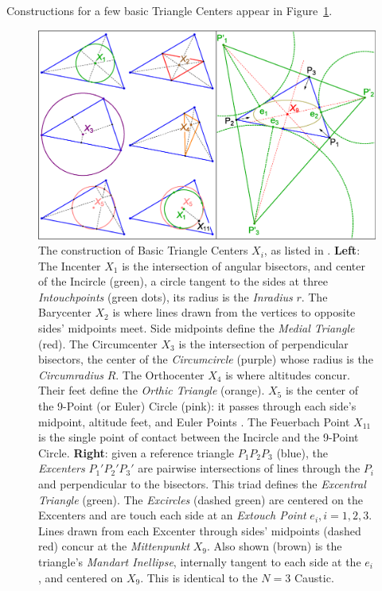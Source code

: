 Constructions for a few basic Triangle Centers appear in Figure~\ref{fig:constructions}.

\begin{figure}
    \centering
    \includegraphics[width=\textwidth]{1010_pics_constr.eps}
    \caption{The construction of Basic Triangle Centers $X_i$, as listed in \cite{etc}. \textbf{Left}: The Incenter $X_1$ is the intersection of angular bisectors, and center of the Incircle (green), a circle tangent to the sides at three {\em Intouchpoints} (green dots), its radius is the {\em Inradius} $r$. The Barycenter $X_2$ is where lines drawn from the vertices to opposite sides' midpoints meet. Side midpoints define the {\em Medial Triangle} (red). The Circumcenter $X_3$ is the intersection of perpendicular bisectors, the center of the {\em Circumcircle} (purple) whose radius is the {\em Circumradius} $R$. The Orthocenter $X_4$ is where altitudes concur. Their feet define the {\em Orthic Triangle} (orange). $X_5$ is the center of the 9-Point (or Euler) Circle (pink): it passes through each side's midpoint, altitude feet, and Euler Points \cite{mw}. The Feuerbach Point $X_{11}$ is the single point of contact between the Incircle and the 9-Point Circle. \textbf{Right}: given a reference triangle $P_1P_2P_3$ (blue), the {\em Excenters} $P_1'P_2'P_3'$ are pairwise intersections of lines through the $P_i$ and perpendicular to the bisectors. This triad defines the {\em Excentral Triangle} (green). The {\em Excircles} (dashed green) are centered on the Excenters and are touch each side at an {\em Extouch Point} $e_i,i=1,2,3$. Lines drawn from each Excenter through sides' midpoints (dashed red) concur at the {\em Mittenpunkt} $X_9$. Also shown (brown) is the triangle's {\em Mandart Inellipse}, internally tangent to each side at the $e_i$, and centered on $X_9$. This is identical to the $N=3$ Caustic.}
    \label{fig:constructions}
\end{figure}

